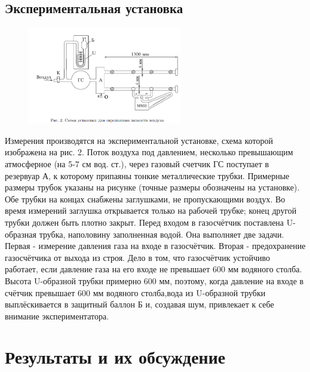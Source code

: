 \documentclass[12pt]{article}
\begin{document}
\subsection*{Экспериментальная установка}
\begin{figure}[H]
    \begin{center}
      \includegraphics[width = 0.6\textwidth]{133_2.png}
    \end{center}
\end{figure}
Измерения производятся на экспериментальной установке, схема которой изображена на рис. 2. Поток воздуха под давлением, несколько превышающим атмосферное (на 5-7 см вод. ст.), через газовый счетчик ГС поступает в резервуар А, к которому припаяны тонкие металлические трубки. Примерные размеры трубок указаны на рисунке (точные размеры обозначены на установке). Обе трубки на концах снабжены заглушками, не пропускающими воздух. Во время измерений заглушка открывается только на рабочей трубке; конец другой трубки должен быть плотно закрыт. Перед входом в газосчётчик поставлена U-образная трубка, наполовину заполненная водой. Она выполняет две задачи. Первая - измерение давления газа на входе в газосчётчик. Вторая - предохранение газосчётчика от выхода из строя. Дело в том, что газосчётчик устойчиво работает, если давление газа на его входе не превышает 600 мм водяного столба. Высота U-образной трубки примерно 600 мм, поэтому, когда давление на входе в счётчик превышает 600 мм водяного столба,вода из U-образной трубки выплёскивается в защитный баллон Б и, создавая шум, привлекает к себе внимание экспериментатора.

\section{Результаты и их обсуждение}
\end{document}
